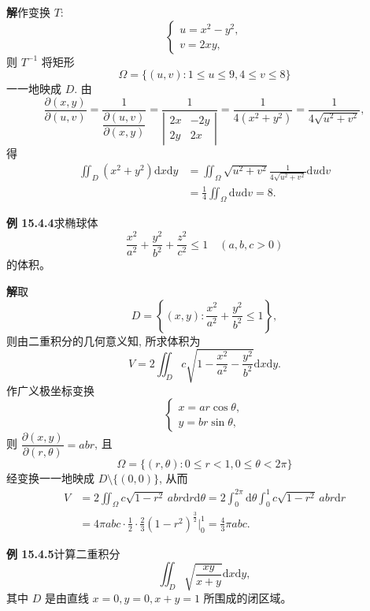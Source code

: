 \documentclass[UTF8,12pt,a4paper,fontset=fandol]{ctexart}
\begin{document}
\noindent\textbf{解}\quad 作变换 $T$:
\[
  \begin{cases}
    u=x^2-y^2,\\
    v=2xy,
  \end{cases}
\]
则 $T^{-1}$ 将矩形
\[
  \Omega=\{(u,v):1\leqslant u\leqslant9,4\leqslant v\leqslant8\}
  \]
一一地映成 $D$. 由
\[
  \frac{\partial(x,y)}{\partial(u,v)}
  =\frac1{\dfrac{\partial(u,v)}{\partial(x,y)}}
  =\frac1{\left|\begin{matrix}2x&-2y\\2y&2x\end{matrix}\right|}
  =\frac1{4(x^2+y^2)}
  =\frac1{4\sqrt{u^2+v^2}},
\]
得
\[
\begin{aligned}
  \iint_D(x^2+y^2)\mathrm dx\mathrm dy
  &=\iint_\Omega\sqrt{u^2+v^2}\frac1{4\sqrt{u^2+v^2}}\mathrm du\mathrm dv\\
  &=\frac14\iint_\Omega\mathrm du\mathrm dv=8.
\end{aligned}
\]

\noindent\textbf{例 15.4.4}\quad 求椭球体
\[
  \frac{x^2}{a^2}+\frac{y^2}{b^2}+\frac{z^2}{c^2}\leqslant1\quad(a,b,c>0)
\]
的体积。

\noindent\textbf{解}\quad 取
\[
  D=\left\{(x,y):\frac{x^2}{a^2}+\frac{y^2}{b^2}\leqslant1\right\},
\]
则由二重积分的几何意义知, 所求体积为
\[
  V=2\iint_D c\sqrt{1-\frac{x^2}{a^2}-\frac{y^2}{b^2}}\mathrm dx\mathrm dy.
\]
作广义极坐标变换
\[
  \begin{cases}
    x=ar\cos\theta,\\
    y=br\sin\theta,
  \end{cases}
\]
则 $\dfrac{\partial(x,y)}{\partial(r,\theta)}=abr$, 且
\[
  \Omega=\{(r,\theta):0\leqslant r<1,0\leqslant\theta<2\pi\}
\]
经变换一一地映成 $D\setminus\{(0,0)\}$, 从而
\[
\begin{aligned}
  V&=2\iint_\Omega c\sqrt{1-r^2}\,abr\mathrm dr\mathrm d\theta
  =2\int_0^{2\pi}\mathrm d\theta\int_0^1 c\sqrt{1-r^2}\,abr\mathrm dr\\
  &=4\pi abc\cdot\frac12\cdot\frac23(1-r^2)^{\frac32}\Big|_0^1
  =\frac43\pi abc.
\end{aligned}
\]

\noindent\textbf{例 15.4.5}\quad 计算二重积分
\[
  \iint_D\sqrt{\frac{xy}{x+y}}\mathrm dx\mathrm dy,
\]
其中 $D$ 是由直线 $x=0,y=0,x+y=1$ 所围成的闭区域。
\end{document}
